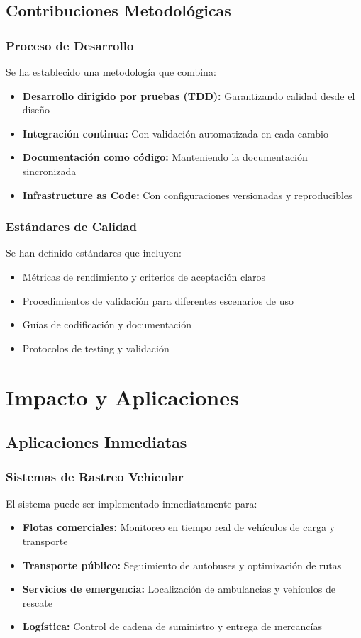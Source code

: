 \subsection{Contribuciones Metodológicas}

\subsubsection{Proceso de Desarrollo}
Se ha establecido una metodología que combina:
\begin{itemize}
    \item \textbf{Desarrollo dirigido por pruebas (TDD):} Garantizando calidad desde el diseño
    \item \textbf{Integración continua:} Con validación automatizada en cada cambio
    \item \textbf{Documentación como código:} Manteniendo la documentación sincronizada
    \item \textbf{Infrastructure as Code:} Con configuraciones versionadas y reproducibles
\end{itemize}

\subsubsection{Estándares de Calidad}
Se han definido estándares que incluyen:
\begin{itemize}
    \item Métricas de rendimiento y criterios de aceptación claros
    \item Procedimientos de validación para diferentes escenarios de uso
    \item Guías de codificación y documentación
    \item Protocolos de testing y validación
\end{itemize}

\section{Impacto y Aplicaciones}

\subsection{Aplicaciones Inmediatas}

\subsubsection{Sistemas de Rastreo Vehicular}
El sistema puede ser implementado inmediatamente para:
\begin{itemize}
    \item \textbf{Flotas comerciales:} Monitoreo en tiempo real de vehículos de carga y transporte
    \item \textbf{Transporte público:} Seguimiento de autobuses y optimización de rutas
    \item \textbf{Servicios de emergencia:} Localización de ambulancias y vehículos de rescate
    \item \textbf{Logística:} Control de cadena de suministro y entrega de mercancías
\end{itemize}

